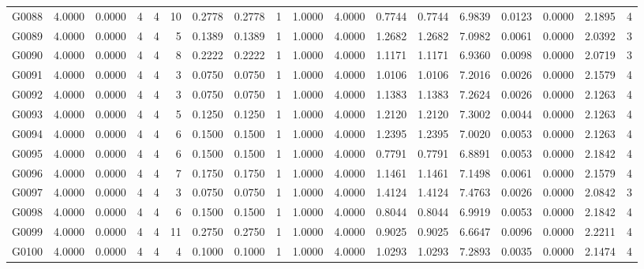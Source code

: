 \begin{tabular}{lrrrrrrrrrrrrrrrrr}
G0088 & 4.0000 & 0.0000 & 4 & 4 & 10 & 0.2778 & 0.2778 & 1 & 1.0000 & 4.0000 & 0.7744 & 0.7744 & 6.9839 & 0.0123 & 0.0000 & 2.1895 & 4 \\
G0089 & 4.0000 & 0.0000 & 4 & 4 & 5 & 0.1389 & 0.1389 & 1 & 1.0000 & 4.0000 & 1.2682 & 1.2682 & 7.0982 & 0.0061 & 0.0000 & 2.0392 & 3 \\
G0090 & 4.0000 & 0.0000 & 4 & 4 & 8 & 0.2222 & 0.2222 & 1 & 1.0000 & 4.0000 & 1.1171 & 1.1171 & 6.9360 & 0.0098 & 0.0000 & 2.0719 & 3 \\
G0091 & 4.0000 & 0.0000 & 4 & 4 & 3 & 0.0750 & 0.0750 & 1 & 1.0000 & 4.0000 & 1.0106 & 1.0106 & 7.2016 & 0.0026 & 0.0000 & 2.1579 & 4 \\
G0092 & 4.0000 & 0.0000 & 4 & 4 & 3 & 0.0750 & 0.0750 & 1 & 1.0000 & 4.0000 & 1.1383 & 1.1383 & 7.2624 & 0.0026 & 0.0000 & 2.1263 & 4 \\
G0093 & 4.0000 & 0.0000 & 4 & 4 & 5 & 0.1250 & 0.1250 & 1 & 1.0000 & 4.0000 & 1.2120 & 1.2120 & 7.3002 & 0.0044 & 0.0000 & 2.1263 & 4 \\
G0094 & 4.0000 & 0.0000 & 4 & 4 & 6 & 0.1500 & 0.1500 & 1 & 1.0000 & 4.0000 & 1.2395 & 1.2395 & 7.0020 & 0.0053 & 0.0000 & 2.1263 & 4 \\
G0095 & 4.0000 & 0.0000 & 4 & 4 & 6 & 0.1500 & 0.1500 & 1 & 1.0000 & 4.0000 & 0.7791 & 0.7791 & 6.8891 & 0.0053 & 0.0000 & 2.1842 & 4 \\
G0096 & 4.0000 & 0.0000 & 4 & 4 & 7 & 0.1750 & 0.1750 & 1 & 1.0000 & 4.0000 & 1.1461 & 1.1461 & 7.1498 & 0.0061 & 0.0000 & 2.1579 & 4 \\
G0097 & 4.0000 & 0.0000 & 4 & 4 & 3 & 0.0750 & 0.0750 & 1 & 1.0000 & 4.0000 & 1.4124 & 1.4124 & 7.4763 & 0.0026 & 0.0000 & 2.0842 & 3 \\
G0098 & 4.0000 & 0.0000 & 4 & 4 & 6 & 0.1500 & 0.1500 & 1 & 1.0000 & 4.0000 & 0.8044 & 0.8044 & 6.9919 & 0.0053 & 0.0000 & 2.1842 & 4 \\
G0099 & 4.0000 & 0.0000 & 4 & 4 & 11 & 0.2750 & 0.2750 & 1 & 1.0000 & 4.0000 & 0.9025 & 0.9025 & 6.6647 & 0.0096 & 0.0000 & 2.2211 & 4 \\
G0100 & 4.0000 & 0.0000 & 4 & 4 & 4 & 0.1000 & 0.1000 & 1 & 1.0000 & 4.0000 & 1.0293 & 1.0293 & 7.2893 & 0.0035 & 0.0000 & 2.1474 & 4 \\
\bottomrule
\end{tabular}
